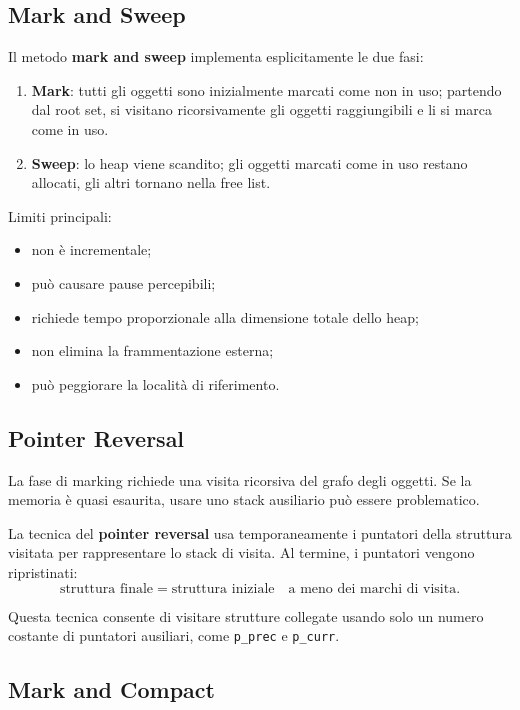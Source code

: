 \documentclass{article}
\begin{document}
\subsection{Mark and Sweep}

Il metodo \textbf{mark and sweep} implementa esplicitamente le due fasi:

\begin{enumerate}
  \item \textbf{Mark}: tutti gli oggetti sono inizialmente marcati come non in uso; partendo dal root set, si visitano ricorsivamente gli oggetti raggiungibili e li si marca come in uso.
  \item \textbf{Sweep}: lo heap viene scandito; gli oggetti marcati come in uso restano allocati, gli altri tornano nella free list.
\end{enumerate}

Limiti principali:
\begin{itemize}
  \item non è incrementale;
  \item può causare pause percepibili;
  \item richiede tempo proporzionale alla dimensione totale dello heap;
  \item non elimina la frammentazione esterna;
  \item può peggiorare la località di riferimento.
\end{itemize}

\subsection{Pointer Reversal}

La fase di marking richiede una visita ricorsiva del grafo degli oggetti. Se la memoria è quasi esaurita, usare uno stack ausiliario può essere problematico.

La tecnica del \textbf{pointer reversal} usa temporaneamente i puntatori della struttura visitata per rappresentare lo stack di visita. Al termine, i puntatori vengono ripristinati:
\[
\text{struttura finale} = \text{struttura iniziale} \quad \text{a meno dei marchi di visita}.
\]

Questa tecnica consente di visitare strutture collegate usando solo un numero costante di puntatori ausiliari, come \texttt{p\_prec} e \texttt{p\_curr}.

\subsection{Mark and Compact}
\end{document}
